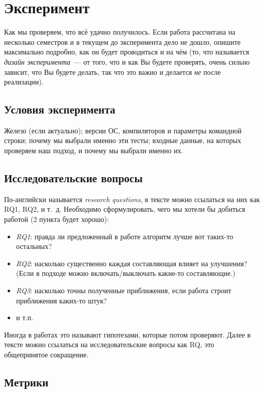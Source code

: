 
\section{Эксперимент}
Как мы проверяем, что всё удачно получилось.
Если работа рассчитана на несколько семестров и в текущем до эксперимента дело не дошло, опишите максимально подробно, как он будет прово\-диться и на чём
(то, что называется \emph{дизайн эксперимента}~--- от того, что и как Вы будете проверять, очень сильно зависит, что Вы будете делать, так что это важно и делается \emph{не} после реализации).

\subsection{Условия эксперимента}
Железо (если актуально);
версии ОС, компиляторов и параметры командной строки;
почему мы выбрали именно эти тесты; входные дан\-ные, на которых проверяем наш подход, и почему мы выбрали именно их.

\subsection{Исследовательские вопросы }
По-английски называется \emph{research questions}, в тексте можно ссылаться на них как RQ1, RQ2, и т.~д.
Необходимо сформулировать, чего мы хотели бы добиться работой (2 пункта будет хорошо):

\begin{itemize}
    \item \emph{RQ1}: правда ли предложенный в работе алгоритм лучше вот таких-то остальных?
    \item \emph{RQ2}: насколько существенно каждая составляющая влияет на улучшения?
          (Если в подходе можно включать/выключать какие-то составляющие.)
    \item \emph{RQ3}: насколько точны полученные приближения, если работа строит приближения каких-то штук?
    \item и т.п.
\end{itemize}

Иногда в работах это называют гипотезами, которые потом проверяют.
Далее в тексте можно ссылаться на исследовательские вопросы как \textsc{RQ}, это обще\-при\-нятое сокращение.

\subsection{Метрики}

